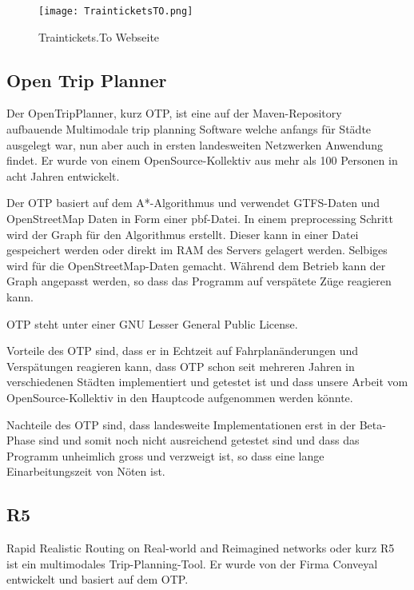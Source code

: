 \begin{figure}[]
	\centering
	\texttt{[image: TrainticketsTO.png]}
	\caption{Traintickets.To Webseite ~\cite{traintickets_site}}
	\label{fig:TrainticketsTO}
\end{figure}     


\subsection{Open Trip Planner}
\label{sec:OTP}

Der OpenTripPlanner, kurz OTP, ist eine auf der Maven-Repository ~\cite{maven_repository} aufbauende Multimodale trip planning Software welche anfangs für Städte ausgelegt war, nun aber auch in ersten landesweiten Netzwerken Anwendung findet. Er wurde von einem OpenSource-Kollektiv aus mehr als 100 Personen in acht Jahren entwickelt. ~\cite{otp_website}

Der OTP basiert auf dem A*-Algorithmus und verwendet GTFS-Daten und OpenStreetMap Daten in Form einer pbf-Datei. In einem preprocessing Schritt wird der Graph für den Algorithmus erstellt. Dieser kann in einer Datei gespeichert werden oder direkt im RAM des Servers gelagert werden. Selbiges wird für die OpenStreetMap-Daten gemacht. Während dem Betrieb kann der Graph angepasst werden, so dass das Programm auf verspätete Züge reagieren kann. ~\cite{otp_git}

OTP steht unter einer GNU Lesser General Public License. 

Vorteile des OTP sind, dass er in Echtzeit auf Fahrplanänderungen und Verspätungen reagieren kann, dass OTP schon seit mehreren Jahren in verschiedenen Städten implementiert und getestet ist und dass unsere Arbeit vom OpenSource-Kollektiv in den Hauptcode aufgenommen werden könnte. 

Nachteile des OTP sind, dass landesweite Implementationen erst in der Beta-Phase sind und somit noch nicht ausreichend getestet sind und dass das Programm unheimlich gross und verzweigt ist, so dass eine lange Einarbeitungszeit von Nöten ist.



\subsection{R5}
\label{sec:R5}

Rapid Realistic Routing on Real-world and Reimagined networks oder kurz R5 ist ein multimodales Trip-Planning-Tool. Er wurde von der Firma Conveyal ~\cite{conveyal} entwickelt und basiert auf dem OTP. 

